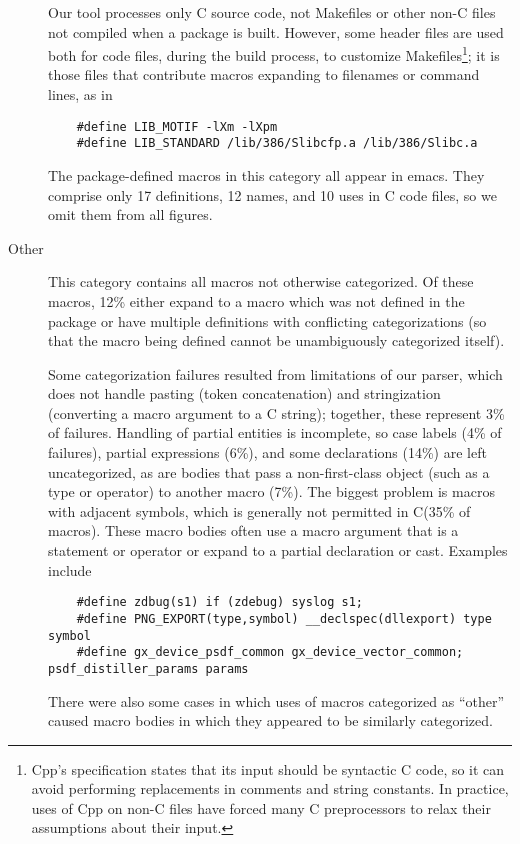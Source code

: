 \documentclass[10pt]{article}
\def\nummacrodefs{26182}        %
\newcommand{\pkg}[1]{\textsf{#1}}
\begin{document}
\begin{description}
  Our tool processes only C source code, not Makefiles or other non-C files
  not compiled when a package is built.  However, some header files are
  used both for code files, during the build process, to customize
  Makefiles\footnote{Cpp's specification states that its input should be
    syntactic C code, so it can avoid performing replacements in comments
    and string constants.  In practice, uses of Cpp on non-C files have
    forced many C preprocessors to relax their assumptions about their
    input.}; it is those files that contribute macros expanding to
  filenames or command lines, as in
\begin{verbatim}
    #define LIB_MOTIF -lXm -lXpm
    #define LIB_STANDARD /lib/386/Slibcfp.a /lib/386/Slibc.a
\end{verbatim}
  The package-defined macros in this category all appear in \pkg{emacs}.
  They comprise only 17 definitions, 12 names, and 10 uses in C
  code files, so we omit them from all figures.
  
\item[Other]
  This category contains all macros not otherwise categorized.  
  Of these macros, 12\% either expand to a macro
  which was not defined in the package or have multiple definitions with
  conflicting categorizations (so that the macro being defined cannot be
  unambiguously categorized itself).
  
  Some categorization failures resulted from limitations of our parser, which does not
  handle pasting (token concatenation) and stringization (converting a macro
  argument to a C string); together, these represent 3\% of failures.  Handling of partial
  entities is incomplete, so case labels (4\% of failures), partial expressions (6\%),
  and some declarations (14\%) are left uncategorized, as are bodies that
  pass a non-first-class object (such as a type or operator) to another
  macro (7\%).  The biggest problem is macros with adjacent symbols, which
  is generally not permitted in C\@ (35\% of macros).  These macro bodies
  often use a macro argument that is a statement or operator or expand to
  a partial declaration or cast.  Examples include
\begin{verbatim}
    #define zdbug(s1) if (zdebug) syslog s1;
    #define PNG_EXPORT(type,symbol) __declspec(dllexport) type symbol
    #define gx_device_psdf_common gx_device_vector_common; psdf_distiller_params params
\end{verbatim}
  There were also some cases in which uses of macros categorized as
  ``other'' caused macro bodies in which they appeared to be similarly
  categorized.
  

\end{description}
\end{document}
